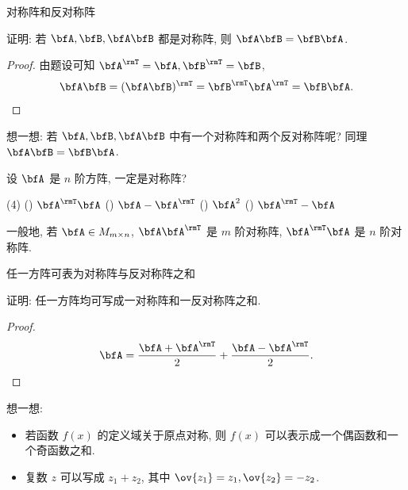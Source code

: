 \begin{frame}{对称阵和反对称阵}
	\onslide<+->
	\begin{example}
		证明: 若 $\bfA,\bfB,\bfA\bfB$ 都是对称阵, 则 $\bfA\bfB=\bfB\bfA$.
	\end{example}
	\onslide<+->
	\begin{proof}
		由题设可知 $\bfA^\rmT=\bfA,\bfB^\rmT=\bfB$,
		\[\bfA\bfB=(\bfA\bfB)^\rmT=\bfB^\rmT\bfA^\rmT=\bfB\bfA.\qedhere\]
	\end{proof}
	\onslide<+->
	想一想: 若 $\bfA,\bfB,\bfA\bfB$ 中有一个对称阵和两个反对称阵呢?
	\onslide<+->
	\alert{同理 $\bfA\bfB=\bfB\bfA$.}
	\onslide<+->
	\begin{exercise}
		设 $\bfA$ 是 $n$ 阶方阵, 一定是对称阵?
		\begin{taskschoice}(4)
			() $\bfA^\rmT\bfA$
			() $\bfA-\bfA^\rmT$
			() $\bfA^2$
			() $\bfA^\rmT-\bfA$
		\end{taskschoice}
	\end{exercise}
	\onslide<+->
	一般地, 若 $\bfA\in M_{m\times n}$, $\bfA\bfA^\rmT$ 是 $m$ 阶对称阵, $\bfA^\rmT\bfA$ 是 $n$ 阶对称阵.
\end{frame}


\begin{frame}{任一方阵可表为对称阵与反对称阵之和}
	\onslide<+->
	\begin{example}
		证明: 任一方阵均可写成一对称阵和一反对称阵之和.
	\end{example}
	\onslide<+->
	\begin{proof}
		\[\bfA=\frac{\bfA+\bfA^\rmT}2+\frac{\bfA-\bfA^\rmT}2.\qedhere\]
	\end{proof}
	\onslide<+->
	想一想:
	\begin{itemize}
		\item 若函数 $f(x)$ 的定义域关于原点对称, 则 $f(x)$ 可以表示成一个偶函数和一个奇函数之和.
		\item 复数 $z$ 可以写成 $z_1+z_2$, 其中 $\ov{z_1}=z_1,\ov{z_2}=-z_2$.
	\end{itemize}
\end{frame}

